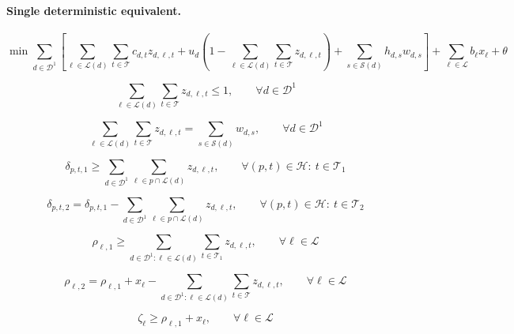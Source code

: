 \documentclass{article}
\begin{document}
\paragraph{Single deterministic equivalent.}
\begin{equation}
\min
\sum_{d\in \mathcal{D}^1}
\left[
\sum_{\ell\in \mathcal{L}(d)} \sum_{t\in \mathcal{T}} c_{d,t} z_{d,\ell,t}
+ u_d \left(1 - \sum_{\ell\in \mathcal{L}(d)} \sum_{t\in \mathcal{T}} z_{d,\ell,t}\right)
+ \sum_{s\in \mathcal{S}(d)} h_{d,s} w_{d,s}
\right]
+ \sum_{\ell\in \mathcal{L}} b_\ell x_\ell
+ \theta
\tag{1}
\end{equation}

\begin{equation}
\sum_{\ell\in \mathcal{L}(d)} \sum_{t\in \mathcal{T}} z_{d,\ell,t} \le 1,
\qquad \forall d \in \mathcal{D}^1
\tag{2}
\end{equation}

\begin{equation}
\sum_{\ell\in \mathcal{L}(d)} \sum_{t\in \mathcal{T}} z_{d,\ell,t}
=
\sum_{s\in \mathcal{S}(d)} w_{d,s},
\qquad \forall d \in \mathcal{D}^1
\tag{3}
\end{equation}

\begin{equation}
\delta_{p,t,1}
\ge
\sum_{d\in \mathcal{D}^1} \sum_{\ell\in p \cap \mathcal{L}(d)} z_{d,\ell,t},
\qquad \forall (p,t) \in \mathcal{H}:\ t \in \mathcal{T}_1
\tag{4}
\end{equation}

\begin{equation}
\delta_{p,t,2}
=
\delta_{p,t,1}
- \sum_{d\in \mathcal{D}^1} \sum_{\ell\in p \cap \mathcal{L}(d)} z_{d,\ell,t},
\qquad \forall (p,t) \in \mathcal{H}:\ t \in \mathcal{T}_2
\tag{5}
\end{equation}

\begin{equation}
\rho_{\ell,1}
\ge
\sum_{d\in \mathcal{D}^1:\ell\in \mathcal{L}(d)} \sum_{t\in \mathcal{T}_1} z_{d,\ell,t},
\qquad \forall \ell \in \mathcal{L}
\tag{6}
\end{equation}

\begin{equation}
\rho_{\ell,2}
=
\rho_{\ell,1} + x_\ell
- \sum_{d\in \mathcal{D}^1:\ell\in \mathcal{L}(d)} \sum_{t\in \mathcal{T}} z_{d,\ell,t},
\qquad \forall \ell \in \mathcal{L}
\tag{7}
\end{equation}

\begin{equation}
\zeta_\ell \ge \rho_{\ell,1} + x_\ell,
\qquad \forall \ell \in \mathcal{L}
\tag{8}
\end{equation}
\end{document}

